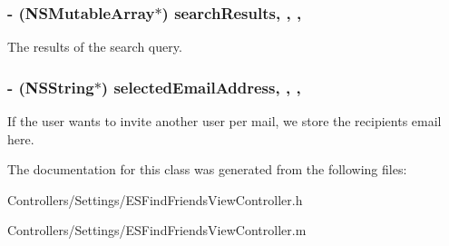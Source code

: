 \subsubsection[{search\+Results}]{\setlength{\rightskip}{0pt plus 5cm}-\/ (N\+S\+Mutable\+Array$\ast$) search\+Results\hspace{0.3cm}{\ttfamily [read]}, {\ttfamily [write]}, {\ttfamily [nonatomic]}, {\ttfamily [strong]}}\label{interface_e_s_find_friends_view_controller_aba3bb2973883c6a6b78e8bdcfb1f7ed7}
The results of the search query. \hypertarget{interface_e_s_find_friends_view_controller_a3796dce47eea3df52570486f147ed4c1}{}
\subsubsection[{selected\+Email\+Address}]{\setlength{\rightskip}{0pt plus 5cm}-\/ (N\+S\+String$\ast$) selected\+Email\+Address\hspace{0.3cm}{\ttfamily [read]}, {\ttfamily [write]}, {\ttfamily [nonatomic]}, {\ttfamily [strong]}}\label{interface_e_s_find_friends_view_controller_a3796dce47eea3df52570486f147ed4c1}
If the user wants to invite another user per mail, we store the recipient\textquotesingle{}s email here. 

The documentation for this class was generated from the following files\+:\begin{DoxyCompactItemize}
\item 
Controllers/\+Settings/E\+S\+Find\+Friends\+View\+Controller.\+h\item 
Controllers/\+Settings/E\+S\+Find\+Friends\+View\+Controller.\+m\end{DoxyCompactItemize}
